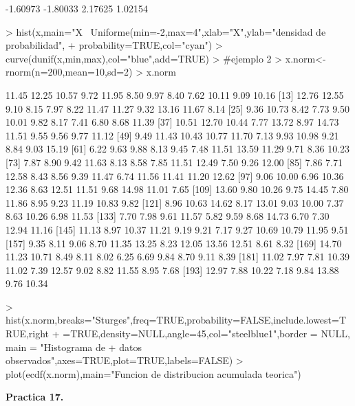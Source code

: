 \documentclass{article}
\begin{document}
\begin{Schunk}
\begin{Soutput}
 [97] -1.60973 -1.80033  2.17625  1.02154
\end{Soutput}
\begin{Sinput}
> hist(x,main="X ~Uniforme(min=-2,max=4",xlab="X",ylab="densidad de probabilidad",
+ probability=TRUE,col="cyan")
> curve(dunif(x,min,max),col="blue",add=TRUE)
> #ejemplo 2
> x.norm<-rnorm(n=200,mean=10,sd=2)
> x.norm
\end{Sinput}
\begin{Soutput}
  [1] 11.45 12.25 10.57  9.72 11.95  8.50  9.97  8.40  7.62 10.11  9.09 10.16
 [13] 12.76 12.55  9.10  8.15  7.97  8.22 11.47 11.27  9.32 13.16 11.67  8.14
 [25]  9.36 10.73  8.42  7.73  9.50 10.01  9.82  8.17  7.41  6.80  8.68 11.39
 [37] 10.51 12.70 10.44  7.77 13.72  8.97 14.73 11.51  9.55  9.56  9.77 11.12
 [49]  9.49 11.43 10.43 10.77 11.70  7.13  9.93 10.98  9.21  8.84  9.03 15.19
 [61]  6.22  9.63  9.88  8.13  9.45  7.48 11.51 13.59 11.29  9.71  8.36 10.23
 [73]  7.87  8.90  9.42 11.63  8.13  8.58  7.85 11.51 12.49  7.50  9.26 12.00
 [85]  7.86  7.71 12.58  8.43  8.56  9.39 11.47  6.74 11.56 11.41 11.20 12.62
 [97]  9.06 10.00  6.96 10.36 12.36  8.63 12.51 11.51  9.68 14.98 11.01  7.65
[109] 13.60  9.80 10.26  9.75 14.45  7.80 11.86  8.95  9.23 11.19 10.83  9.82
[121]  8.96 10.63 14.62  8.17 13.01  9.03 10.00  7.37  8.63 10.26  6.98 11.53
[133]  7.70  7.98  9.61 11.57  5.82  9.59  8.68 14.73  6.70  7.30 12.94 11.16
[145] 11.13  8.97 10.37 11.21  9.19  9.21  7.17  9.27 10.69 10.79 11.95  9.51
[157]  9.35  8.11  9.06  8.70 11.35 13.25  8.23 12.05 13.56 12.51  8.61  8.32
[169] 14.70 11.23 10.71  8.49  8.11  8.02  6.25  6.69  9.84  8.70  9.11  8.39
[181] 11.02  7.97  7.81 10.39 11.02  7.39 12.57  9.02  8.82 11.55  8.95  7.68
[193] 12.97  7.88 10.22  7.18  9.84 13.88  9.76 10.34
\end{Soutput}
\begin{Sinput}
> hist(x.norm,breaks="Sturges",freq=TRUE,probability=FALSE,include.lowest=TRUE,right
+ =TRUE,density=NULL,angle=45,col="steelblue1",border = NULL, main = "Histograma de
+ datos observados",axes=TRUE,plot=TRUE,labels=FALSE)
> plot(ecdf(x.norm),main="Funcion de distribucion acumulada teorica")
\end{Sinput}
\end{Schunk}

\textbf{Practica 17.}
\end{document}
